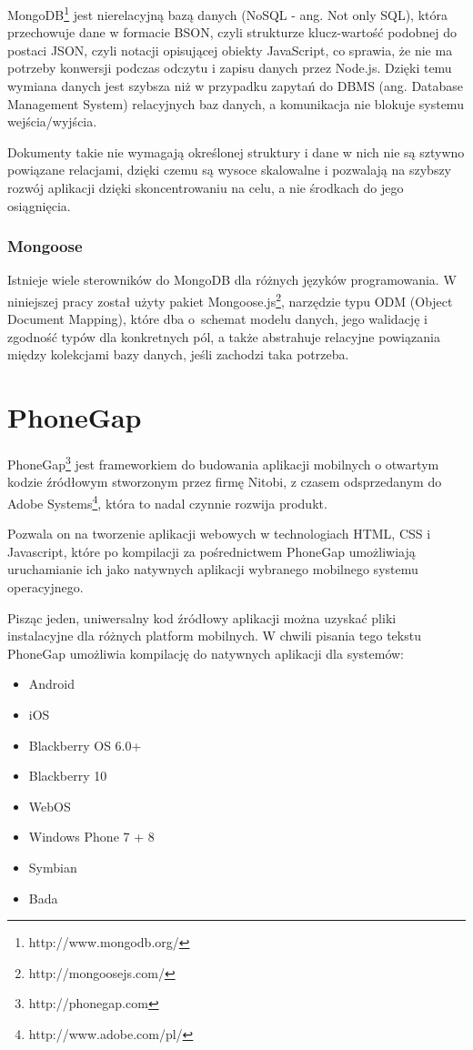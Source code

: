 \documentclass[twoside,a4paper,openright,12pt]{book}
\begin{document}
MongoDB\footnote{http://www.mongodb.org/} jest nierelacyjną bazą danych (NoSQL - ang. Not only SQL), która przechowuje dane w formacie BSON, czyli strukturze klucz-wartość podobnej do postaci JSON, czyli notacji opisującej obiekty JavaScript, co sprawia, że nie ma potrzeby konwersji podczas odczytu i zapisu danych przez Node.js. Dzięki temu wymiana danych jest szybsza niż w przypadku zapytań do DBMS (ang. Database Management System) relacyjnych baz danych, a komunikacja nie blokuje systemu wejścia/wyjścia.

Dokumenty takie nie wymagają określonej struktury i dane w nich nie są sztywno powiązane relacjami, dzięki czemu są wysoce skalowalne i pozwalają na szybszy rozwój aplikacji dzięki skoncentrowaniu na celu, a nie środkach do jego osiągnięcia.\cite{chodorow2013mongodb}

\subsubsection{Mongoose}

Istnieje wiele sterowników do MongoDB dla różnych języków programowania. W niniejszej pracy został użyty pakiet Mongoose.js\footnote{http://mongoosejs.com/}, narzędzie typu ODM (Object Document Mapping), które dba o~schemat modelu danych, jego walidację i zgodność typów dla konkretnych pól, a także abstrahuje relacyjne powiązania między kolekcjami bazy danych, jeśli zachodzi taka potrzeba.


\section{PhoneGap}

PhoneGap\footnote{http://phonegap.com} jest frameworkiem do budowania aplikacji mobilnych o otwartym kodzie źródłowym stworzonym przez firmę Nitobi, z czasem odsprzedanym do Adobe Systems\footnote{http://www.adobe.com/pl/}, która to nadal czynnie rozwija produkt.

Pozwala on na tworzenie aplikacji webowych w technologiach HTML, CSS i Javascript, które po kompilacji za pośrednictwem PhoneGap umożliwiają uruchamianie ich jako natywnych aplikacji wybranego mobilnego systemu operacyjnego. \cite{stark2013android}

Pisząc jeden, uniwersalny kod źródłowy aplikacji można uzyskać pliki instalacyjne dla różnych platform mobilnych. W chwili pisania tego tekstu PhoneGap umożliwia kompilację do natywnych aplikacji dla systemów:
\begin{itemize}
	\item Android
	\item iOS
	\item Blackberry OS 6.0+
	\item Blackberry 10
	\item WebOS
	\item Windows Phone 7 + 8
	\item Symbian
	\item Bada
\end{itemize}
\end{document}
